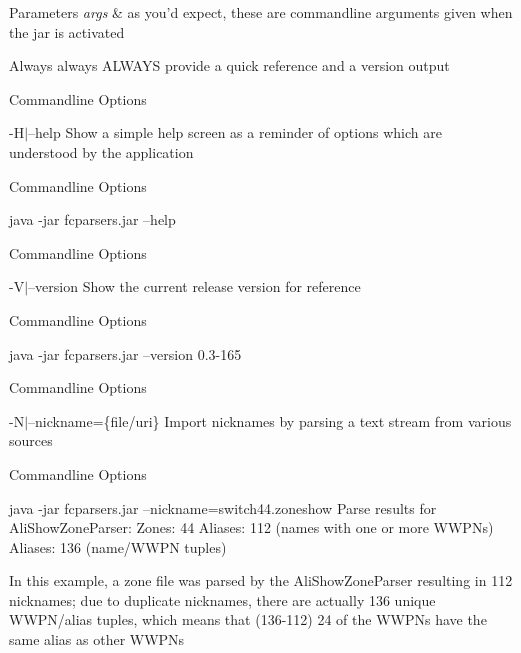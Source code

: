 \begin{DoxyParams}{Parameters}
{\em args} & as you'd expect, these are commandline arguments given when the jar is activated \\
\hline
\end{DoxyParams}
\begin{DoxyVerb}Always always ALWAYS provide a quick reference and a version output
\end{DoxyVerb}


\begin{DoxyRefDesc}{Commandline Options}
\item[{\bf Commandline Options}]-\/\+H$\vert$--help Show a simple help screen as a reminder of options which are understood by the application \end{DoxyRefDesc}
\begin{DoxyRefDesc}{Commandline Options}
\item[{\bf Commandline Options}]
\begin{DoxyCode}
java -jar fcparsers.jar --help 
\end{DoxyCode}
\end{DoxyRefDesc}


\begin{DoxyRefDesc}{Commandline Options}
\item[{\bf Commandline Options}]-\/\+V$\vert$--version Show the current release version for reference \end{DoxyRefDesc}
\begin{DoxyRefDesc}{Commandline Options}
\item[{\bf Commandline Options}]
\begin{DoxyCode}
java -jar fcparsers.jar --version
0.3-165 
\end{DoxyCode}
\end{DoxyRefDesc}


\begin{DoxyRefDesc}{Commandline Options}
\item[{\bf Commandline Options}]-\/\+N$\vert$--nickname=\{file/uri\} Import nicknames by parsing a text stream from various sources \end{DoxyRefDesc}
\begin{DoxyRefDesc}{Commandline Options}
\item[{\bf Commandline Options}]
\begin{DoxyCode}
 java -jar fcparsers.jar --nickname=switch44.zoneshow
Parse results \textcolor{keywordflow}{for} AliShowZoneParser:
Zones: 44
Aliases: 112 (names with one or more WWPNs)
Aliases: 136 (name/WWPN tuples) 
\end{DoxyCode}
 In this example, a zone file was parsed by the Ali\+Show\+Zone\+Parser resulting in 112 nicknames; due to duplicate nicknames, there are actually 136 unique W\+W\+P\+N/alias tuples, which means that (136-\/112) 24 of the W\+W\+P\+Ns have the same alias as other W\+W\+P\+Ns\end{DoxyRefDesc}


